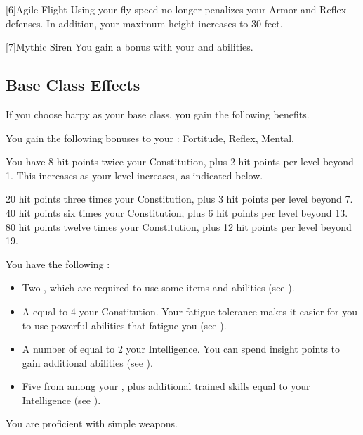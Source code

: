 [6]{Agile Flight} Using your fly speed no longer penalizes your Armor and Reflex defenses.
In addition, your maximum height increases to 30 feet.

[7]{Mythic Siren} You gain a   bonus with your  and  abilities.

\subsection{Base Class Effects}
If you choose harpy as your base class, you gain the following benefits.

You gain the following bonuses to your :  Fortitude,  Reflex,  Mental.

You have 8 hit points \add twice your Constitution, plus 2 hit points per level beyond 1.
This increases as your level increases, as indicated below.
\begin{itemize}
	 20 hit points \add three times your Constitution, plus 3 hit points per level beyond 7.
	 40 hit points \add six times your Constitution, plus 6 hit points per level beyond 13.
	 80 hit points \add twelve times your Constitution, plus 12 hit points per level beyond 19.
\end{itemize}

 You have the following :
\begin{itemize}
	\item Two , which are required to use some items and abilities (see ).
	\item A  equal to 4 \add your Constitution.
	      Your fatigue tolerance makes it easier for you to use powerful abilities that fatigue you (see ).
	\item A number of  equal to 2 \add your Intelligence.
	      You can spend insight points to gain additional abilities (see ).
	\item Five  from among your , plus additional trained skills equal to your Intelligence (see ).
\end{itemize}

You are proficient with simple weapons.

